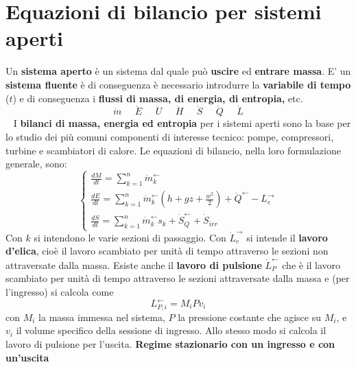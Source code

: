 \section{Equazioni di bilancio per sistemi aperti}
Un \textbf{sistema aperto} è un sistema dal quale può \textbf{uscire} ed \textbf{entrare massa}.\newline
\newline
E' un \textbf{sistema fluente} è di conseguenza è necessario introdurre la \textbf{variabile di tempo} ($t$) e di conseguenza i \textbf{flussi di massa, di energia, di entropia,} etc.
\[
    \dot{m} \;\;\;\;\; \dot{E}\;\;\;\;\; \dot{U} \;\;\;\;\; \dot{H} \;\;\;\;\; \dot{S} \;\;\;\;\; \dot{Q} \;\;\;\;\; \dot{L}
\]
\ \newline
I \textbf{bilanci di massa, energia ed entropia} per i sistemi aperti sono la base per lo studio dei più
comuni componenti di interesse tecnico: pompe, compressori, turbine e scambiatori di calore. \newline
\newline
Le equazioni di bilancio, nella loro formulazione generale, sono:
\[
    \begin{cases}
        \frac{dM}{dt} = \sum_{k=1}^{n}\dot{m}_k^\leftarrow \\
        \frac{dE}{dt} = \sum_{k=1}^{n}\dot{m}_k^\leftarrow  \left(h + gz + \frac{w^2}{2}\right) + \dot{Q}^\leftarrow  - L_e^\rightarrow \\
        \frac{dS}{dt} = \sum_{k=1}^{n} \dot{m}_k^\leftarrow  s_k + \dot{S}_Q^\leftarrow + \dot{S}_{irr}
    \end{cases}
\]
Con $k$ si intendono le varie sezioni di passaggio.\newline
Con $\dot{L}_e^\rightarrow $ si intende il \textbf{lavoro d'elica}, cioè il lavoro scambiato per unità di tempo attraverso le sezioni non attraversate dalla massa.\newline 
Esiste anche il \textbf{lavoro di pulsione} $\dot{L}_P^\leftarrow $ che è il lavoro scambiato per unità di tempo attraverso le sezioni attraversate dalla massa e (per l'ingresso) si calcola come
\[
    L_{P,i}^\leftarrow  = M_i P v_i
\]
con $M_i$ la massa immessa nel sistema, $P$ la pressione costante che agisce su $M_i$, e $v_i$ il volume specifico della sessione di ingresso. Allo stesso modo si calcola il lavoro di pulsione per l'uscita.\newline
\newline
\newline
\newline
\textbf{Regime stazionario con un ingresso e con un'uscita}\newline
